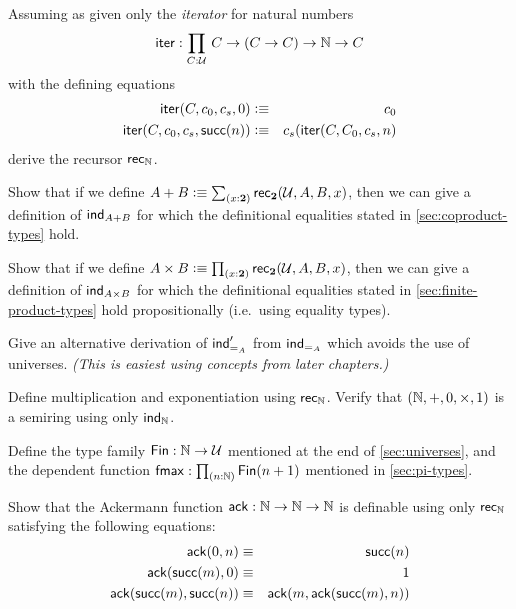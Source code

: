 \begin{ex}
Assuming as given only the \emph{iterator} for natural numbers
\[\ite : \prd{C:\UU} C \to (C \to C) \to \nat \to C \]
with the defining equations
\begin{eqnarray*}
\mathsf{iter}(C,c_0,c_s,0)  & \vcentcolon\equiv & c_0 \\
\mathsf{iter}(C,c_0,c_s,\mathsf{succ}(n)) & \vcentcolon\equiv & c_s(\mathsf{iter}(C,C_0,c_s,n)  
\end{eqnarray*}
derive the recursor $\mathsf{rec}_{\mathbb{N}}$.
\end{ex}

\begin{ex}\label{ex:sum-via-bool}
%
Show that if we define $A + B \defeq \sm{x:\bool} \rec{\bool}(\UU,A,B,x)$, then we can give a definition of $\mathsf{ind}_{A+B}$ for which the definitional equalities stated in \autoref{sec:coproduct-types} hold.
\end{ex}

\begin{ex}\label{ex:prod-via-bool}
%
Show that if we define $A \times B \defeq \prd{x:\bool}\rec{\bool}(\UU,A,B,x)$, then we can give a definition of  $\mathsf{ind}_{A\times B}$ for which the definitional equalities stated in \autoref{sec:finite-product-types} hold propositionally (i.e.\ using equality types).
\end{ex}

\begin{ex}\label{ex:pm-to-ml}
Give an alternative derivation of $\mathsf{ind}_{=_{A}}'$ from $\mathsf{ind}_{=_{A}}$ which avoids the use of universes.
  \emph{(This is easiest using concepts from later chapters.)}
\end{ex}

\begin{ex}
  Define multiplication and exponentiation using $\mathsf{rec}_{\mathbb{N}}$.
  Verify that $(\mathbb{N},+,0,\times,1)$ is a semiring using only $\mathsf{ind}_{\mathbb{N}}$.  
\end{ex}

\begin{ex}\label{ex:fin}
  Define the type family $\mathsf{Fin} : \mathbb{N} \to \mathcal{U}$ mentioned at the end of \autoref{sec:universes}, and the dependent function $\fmax : \prd{n:\nat} \Fin(n+1)$ mentioned in \autoref{sec:pi-types}.
\end{ex}

\begin{ex}\label{ex:ackermann}
  Show that the Ackermann function $\mathsf{ack} : \mathbb{N} \to \mathbb{N} \to \mathbb{N}$ is definable using only $\mathsf{rec}_{\mathbb{N}}$ satisfying the following equations:
  \begin{eqnarray*}
    \mathsf{ack}(0,n) & \equiv & \mathsf{succ}(n) \\
    \mathsf{ack}(\mathsf{succ}(m),0) & \equiv & 1 \\
    \mathsf{ack}(\mathsf{succ}(m),\mathsf{succ}(n)) & \equiv & \mathsf{ack}(m,\mathsf{ack}(\mathsf{succ}(m),n))
  \end{eqnarray*}
\end{ex}

